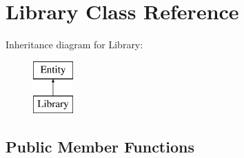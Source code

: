 \hypertarget{classLibrary}{
\section{Library Class Reference}
\label{classLibrary}
}
Inheritance diagram for Library:\begin{figure}[H]
\begin{center}
\leavevmode
\includegraphics[height=2.000000cm]{classLibrary}
\end{center}
\end{figure}
\subsection*{Public Member Functions}
